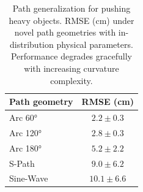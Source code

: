 \begin{table}[t]
\footnotesize
\centering
\begin{tabular}{l c}
\toprule
Path geometry & RMSE (cm) \\
\midrule
Arc 60°   & $2.2 \pm 0.3$ \\
Arc 120°  & $2.8 \pm 0.3$ \\
Arc 180°  & $5.2 \pm 2.2$ \\
S-Path    & $9.0 \pm 6.2$ \\
Sine-Wave & $10.1 \pm 6.6$ \\
\bottomrule
\end{tabular}
\caption{Path generalization for pushing heavy objects. RMSE (cm) under novel path geometries with in-distribution physical parameters. Performance degrades gracefully with increasing curvature complexity.}
\label{tab:pho_paths}
\end{table}
